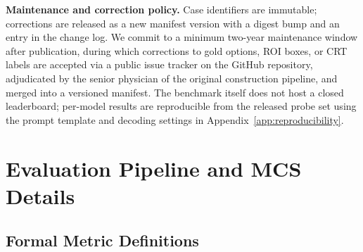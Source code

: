 \documentclass{article}
\begin{document}
\textbf{Maintenance and correction policy.} Case identifiers are immutable; corrections are released as a new manifest version with a digest bump and an entry in the change log. We commit to a minimum two-year maintenance window after publication, during which corrections to gold options, ROI boxes, or CRT labels are accepted via a public issue tracker on the GitHub repository, adjudicated by the senior physician of the original construction pipeline, and merged into a versioned manifest. The benchmark itself does not host a closed leaderboard; per-model results are reproducible from the released probe set using the prompt template and decoding settings in Appendix~\ref{app:reproducibility}.

\section{Evaluation Pipeline and MCS Details}
\label{app:eval_pipeline_detail}


\subsection{Formal Metric Definitions}
\label{app:metric_formulas}
\end{document}
